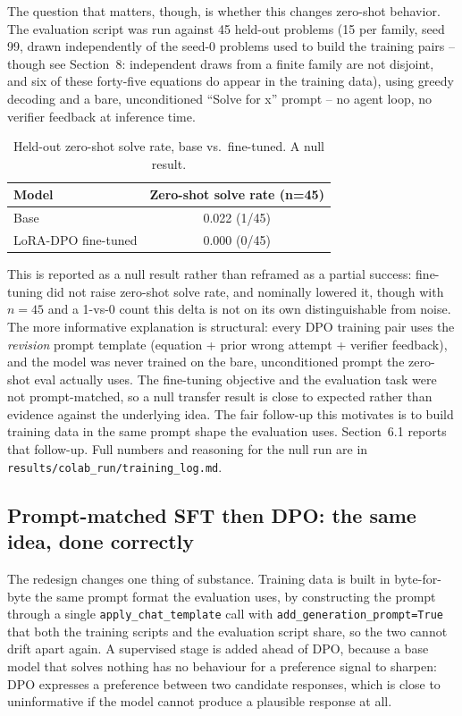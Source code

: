 \documentclass[11pt]{article}
\begin{document}
The question that matters, though, is whether this changes zero-shot
behavior. The evaluation script was run against 45 held-out problems (15
per family, seed 99, drawn independently of the seed-0 problems used to
build the training pairs -- though see Section~8: independent draws from a
finite family are not disjoint, and six of these forty-five equations do
appear in the training data), using greedy decoding and a bare, unconditioned
``Solve for x'' prompt -- no agent loop, no verifier feedback at
inference time.

\begin{table}[h]
\centering
\begin{tabular}{lc}
\toprule
Model & Zero-shot solve rate (n=45) \\
\midrule
Base & 0.022 (1/45) \\
LoRA-DPO fine-tuned & 0.000 (0/45) \\
\bottomrule
\end{tabular}
\caption{Held-out zero-shot solve rate, base vs.\ fine-tuned. A null result.}
\end{table}

This is reported as a null result rather than reframed as a partial
success: fine-tuning did not raise zero-shot solve rate, and nominally
lowered it, though with $n=45$ and a 1-vs-0 count this delta is not on its
own distinguishable from noise. The more informative explanation is
structural: every DPO training pair uses the \emph{revision} prompt
template (equation + prior wrong attempt + verifier feedback), and the
model was never trained on the bare, unconditioned prompt the zero-shot
eval actually uses. The fine-tuning objective and the evaluation task were
not prompt-matched, so a null transfer result is close to expected rather
than evidence against the underlying idea. The fair follow-up this
motivates is to build training data in the same prompt shape the
evaluation uses. Section~6.1 reports that follow-up. Full numbers and
reasoning for the null run are in
\texttt{results/colab\_run/training\_log.md}.

\subsection{Prompt-matched SFT then DPO: the same idea, done correctly}
The redesign changes one thing of substance. Training data is built in
byte-for-byte the same prompt format the evaluation uses, by constructing
the prompt through a single \texttt{apply\_chat\_template} call with
\texttt{add\_generation\_prompt=True} that both the training scripts and
the evaluation script share, so the two cannot drift apart again. A
supervised stage is added ahead of DPO, because a base model that solves
nothing has no behaviour for a preference signal to sharpen: DPO expresses
a preference between two candidate responses, which is close to
uninformative if the model cannot produce a plausible response at all.
\end{document}
